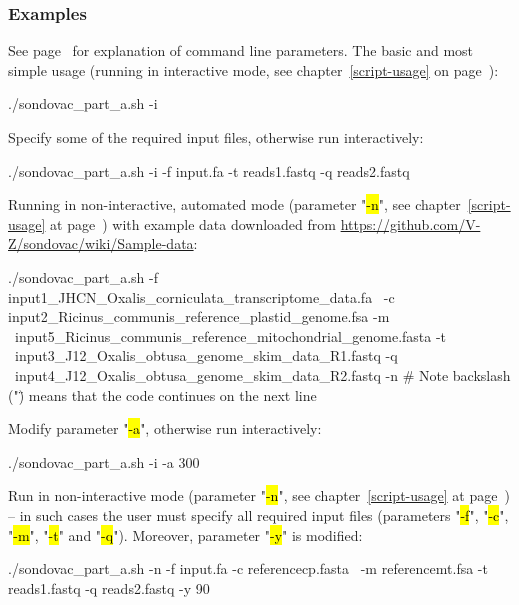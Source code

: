 \documentclass[a4paper, 11pt, twoside]{article}
\renewcommand{\texttt}[1]{\hl{\ttfamily #1}}
\begin{document}
\subsubsection{Examples}

See page~\pageref{script-usage} for explanation of command line parameters. The basic and most simple usage (running in interactive mode, see chapter~\ref{script-usage} on page~\pageref{script-usage}):

\begin{bashcode}
  ./sondovac_part_a.sh -i
\end{bashcode}

Specify some of the required input files, otherwise run interactively:

\begin{bashcode}
  ./sondovac_part_a.sh -i -f input.fa -t reads1.fastq -q reads2.fastq
\end{bashcode}

Running in non-interactive, automated mode (parameter "\texttt{-n}", see chapter~\ref{script-usage} at page~\pageref{script-usage}) with 
example data downloaded from \url{https://github.com/V-Z/sondovac/wiki/Sample-data}:

\begin{bashcode}
  ./sondovac_part_a.sh -f input1_JHCN_Oxalis_corniculata_transcriptome_data.fa \
    -c input2_Ricinus_communis_reference_plastid_genome.fsa -m \
    input5_Ricinus_communis_reference_mitochondrial_genome.fasta -t \
    input3_J12_Oxalis_obtusa_genome_skim_data_R1.fastq -q \
    input4_J12_Oxalis_obtusa_genome_skim_data_R2.fastq -n
  # Note backslash ("\") means that the code continues on the next line
\end{bashcode}

Modify parameter "\texttt{-a}", otherwise run interactively:

\begin{bashcode}
  ./sondovac_part_a.sh -i -a 300
\end{bashcode}

Run in non-interactive mode (parameter "\texttt{-n}", see chapter~\ref{script-usage} at page~\pageref{script-usage}) -- in such cases the user must specify all required input files (parameters "\texttt{-f}", "\texttt{-c}", "\texttt{-m}", "\texttt{-t}" and "\texttt{-q}"). Moreover, parameter "\texttt{-y}" is modified:

\begin{bashcode}
  ./sondovac_part_a.sh -n -f input.fa -c referencecp.fasta \
    -m referencemt.fsa -t reads1.fastq -q reads2.fastq -y 90
\end{bashcode}
\end{document}
